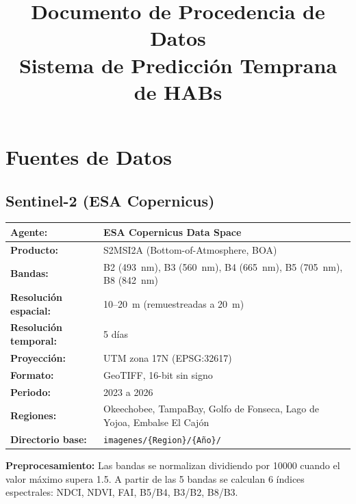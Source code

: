 \documentclass[12pt]{article}
\title{Documento de Procedencia de Datos\\\small{Sistema de Predicci\'on Temprana de HABs}}
\author{}
\date{}
\newlength{\descrwidth}
\begin{document}
\maketitle
\thispagestyle{empty}
\newpage

\section{Fuentes de Datos}

\subsection{Sentinel-2 (ESA Copernicus)}
\begin{tabular}{P{\descrwidth} P{\dimexpr\textwidth-\tabcolsep\relax}}
\toprule
\textbf{Agente:} & ESA Copernicus Data Space \\
\midrule
\textbf{Producto:} & S2MSI2A (Bottom-of-Atmosphere, BOA) \\
\midrule
\textbf{Bandas:} & B2 (493~nm), B3 (560~nm), B4 (665~nm), B5 (705~nm), B8 (842~nm) \\
\midrule
\textbf{Resoluci\'on espacial:} & 10--20~m (remuestreadas a 20~m) \\
\midrule
\textbf{Resoluci\'on temporal:} & 5 d\'ias \\
\midrule
\textbf{Proyecci\'on:} & UTM zona 17N (EPSG:32617) \\
\midrule
\textbf{Formato:} & GeoTIFF, 16-bit sin signo \\
\midrule
\textbf{Periodo:} & 2023 a 2026 \\
\midrule
\textbf{Regiones:} & Okeechobee, TampaBay, Golfo de Fonseca, Lago de Yojoa, Embalse El Caj\'on \\
\midrule
\textbf{Directorio base:} & \texttt{imagenes/\{Region\}/\{A\~no\}/} \\
\bottomrule
\end{tabular}

\textbf{Preprocesamiento:} Las bandas se normalizan dividiendo por 10000 cuando el valor m\'aximo supera 1.5. A partir de las 5 bandas se calculan 6 \'indices espectrales: NDCI, NDVI, FAI, B5/B4, B3/B2, B8/B3.
\end{document}
